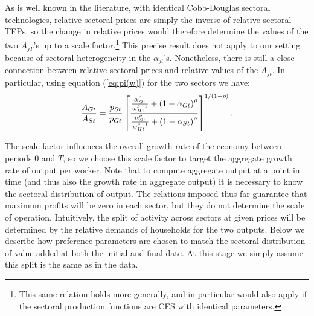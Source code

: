 \documentclass[12pt,english]{article}
\begin{document}
{\normalsize As is well known in the literature, with identical Cobb-Douglas
sectoral technologies, relative sectoral prices are simply the inverse of
relative sectoral TFPs, so the change in relative prices would therefore
determine the values of the two $A_{jT}$'s up to a scale factor.\footnote{%
This same relation holds more generally, and in particular would also apply
if the sectoral production functions are CES with identical parameters.}
This precise result does not apply to our setting because of sectoral
heterogeneity in the $\alpha _{jt}$'s. Nonetheless, there is still a close
connection between relative sectoral prices and relative values of the $%
A_{jt}$. In particular, using equation (\ref{eq:pi(w)}) for the two sectors
we have: 
\begin{equation}
\frac{A_{Gt}}{A_{St}}=\frac{p_{St}}{p_{Gt}}\left[ \frac{\frac{\alpha
_{Gt}^{\rho }}{w_{Ht}^{\rho -1}}+\left( 1-\alpha _{Gt}\right) ^{\rho }}{%
\frac{\alpha _{St}^{\rho }}{w_{Ht}^{\rho -1}}+\left( 1-\alpha _{St}\right)
^{\rho }}\right] ^{1/(1-\rho )}.  \label{moment_A_A}
\end{equation}
}

{\normalsize The scale factor influences the overall growth rate of the
economy between periods $0$ and $T$, so we choose this scale factor to
target the aggregate growth rate of output per worker. Note that to compute
aggregate output at a point in time (and thus also the growth rate in
aggregate output) it is necessary to know the sectoral distribution of
output. The relations imposed thus far guarantee that maximum profits will
be zero in each sector, but they do not determine the scale of operation.
Intuitively, the split of activity across sectors at given prices will be
determined by the relative demands of households for the two outputs. Below
we describe how preference parameters are chosen to match the sectoral
distribution of value added at both the initial and final date. At this
stage we simply assume this split is the same as in the data. }
\end{document}
